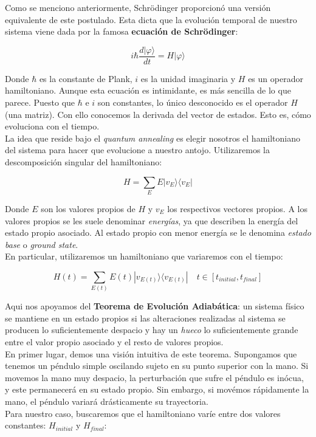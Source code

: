 \documentclass[11pt]{article}
\newcommand*{\ra}{\rangle}
\newcommand*{\la}{\langle}
\begin{document}
Como se menciono anteriormente, Schrödinger proporcionó una versión equivalente de este postulado. Esta dicta que la evolución temporal de nuestro sistema viene dada por la famosa \textbf{ecuación de Schrödinger}:

\[ i \hbar \frac{d|\varphi\ra}{dt} = H|\varphi\ra \]

Donde $\hbar$ es la constante de Plank, $i$ es la unidad imaginaria y $H$ es un operador hamiltoniano. Aunque esta ecuación es intimidante, es más sencilla de lo que parece. Puesto que $\hbar$ e $i$ son constantes, lo único desconocido es el operador $H$ (una matriz). Con ello conocemos la derivada del vector de estados. Esto es, cómo evoluciona con el tiempo. \\

La idea que reside bajo el \emph{quantum annealing} es elegir nosotros el hamiltoniano del sistema para hacer que evolucione a nuestro antojo. Utilizaremos la descomposición singular del hamiltoniano:

\[ H = \sum_E E |v_E\ra\la v_E| \]

Donde $E$ son los valores propios de $H$ y $v_E$ los respectivos vectores propios. A los valores propios se les suele denominar \emph{energías}, ya que describen la energía del estado propio asociado. Al estado propio con menor energía se le denomina \emph{estado base} o \emph{ground state}. \\

En particular, utilizaremos un hamiltoniano que variaremos con el tiempo:

\[ H(t) = \sum_{E(t)} E(t) |v_{E(t)}\ra\la v_{E(t)}| \quad t \in [t_{initial}, t_{final}] \]

Aqui nos apoyamos del \textbf{Teorema de Evolución Adiabática}: un sistema físico se mantiene en un estado propios si las alteraciones realizadas al sistema se producen lo suficientemente despacio y hay un \emph{hueco} lo suficientemente grande entre el valor propio asociado y el resto de valores propios. \\

En primer lugar, demos una visión intuitiva de este teorema. Supongamos que tenemos un péndulo simple oscilando sujeto en su punto superior con la mano. Si movemos la mano muy despacio, la perturbación que sufre el péndulo es inócua, y este permanecerá en su estado propio. Sin embargo, si movémos rápidamente la mano, el péndulo variará drásticamente su trayectoria. \\

Para nuestro caso, buscaremos que el hamiltoniano varíe entre dos valores constantes: $H_{initial}$ y $H_{final}$:
\end{document}

